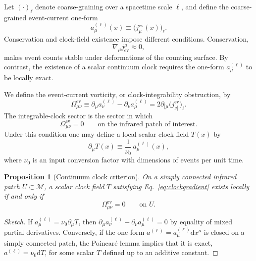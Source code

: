\documentclass[11pt, a4paper]{article}
\theoremstyle{definition}
\theoremstyle{plain}
\newtheorem{proposition}{Proposition}[section]
\theoremstyle{remark}
\numberwithin{equation}{section}
\newcommand{\dd}{\mathrm{d}}
\begin{document}
    Let $(\cdot)_\ell$ denote coarse-graining over a spacetime scale $\ell$, and define the coarse-grained event-current one-form
    \begin{equation}
        a^{(\ell)}_\mu(x) \equiv \big(j^{\mathrm{ev}}_\mu(x)\big)_\ell .
        \label{eq:clockoneform}
    \end{equation}
    Conservation and clock-field existence impose different conditions. Conservation,
    \begin{equation}
        \nabla_\mu j^\mu_{\mathrm{ev}}\approx 0,
    \end{equation}
    makes event counts stable under deformations of the counting surface. By contrast, the existence of a scalar continuum clock requires the one-form $a^{(\ell)}_\mu$ to be locally exact.
    
    We define the event-current vorticity, or clock-integrability obstruction, by
    \begin{equation}
        \Omega^{\mathrm{ev}}_{\mu\nu}
        \equiv
        \partial_\mu a^{(\ell)}_\nu
        -
        \partial_\nu a^{(\ell)}_\mu
        =
        2\partial_{[\mu}\big(j^{\mathrm{ev}}_{\nu]}\big)_\ell .
        \label{eq:eventvorticity}
    \end{equation}
    The integrable-clock sector is the sector in which
    \begin{equation}
        \Omega^{\mathrm{ev}}_{\mu\nu}=0
        \qquad\text{on the infrared patch of interest.}
        \label{eq:integrability}
    \end{equation}
    Under this condition one may define a local scalar clock field $T(x)$ by
    \begin{equation}
        \partial_\mu T(x) \equiv \frac{1}{\nu_0}\,a^{(\ell)}_\mu(x),
        \label{eq:clockgradient}
    \end{equation}
    where $\nu_0$ is an input conversion factor with dimensions of events per unit time.
    
    \begin{proposition}[Continuum clock criterion]
        On a simply connected infrared patch $U\subset\mathcal{M}$, a scalar clock field $T$ satisfying Eq.~\eqref{eq:clockgradient} exists locally if and only if
        \begin{equation}
            \Omega^{\mathrm{ev}}_{\mu\nu}=0
            \qquad \text{on } U .
        \end{equation}
    \end{proposition}
    
    \begin{proof}[Sketch]
        If $a^{(\ell)}_\mu=\nu_0\partial_\mu T$, then $\partial_\mu a^{(\ell)}_\nu-\partial_\nu a^{(\ell)}_\mu=0$ by equality of mixed partial derivatives. Conversely, if the one-form $a^{(\ell)}=a^{(\ell)}_\mu\dd x^\mu$ is closed on a simply connected patch, the Poincar\'e lemma implies that it is exact, $a^{(\ell)}=\nu_0\dd T$, for some scalar $T$ defined up to an additive constant.
    \end{proof}
    
\end{document}
